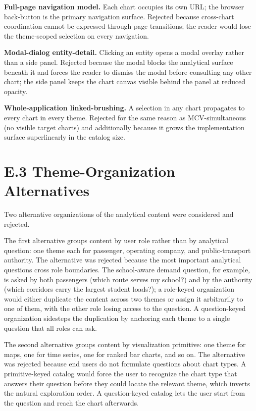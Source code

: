 \noindent\textbf{Full-page navigation model.}
Each chart occupies its own URL; the browser back-button is the
primary navigation surface. Rejected because cross-chart coordination
cannot be expressed through page transitions; the reader would lose
the theme-scoped selection on every navigation.

\noindent\textbf{Modal-dialog entity-detail.}
Clicking an entity opens a modal overlay rather than a side panel.
Rejected because the modal blocks the analytical surface beneath it
and forces the reader to dismiss the modal before consulting any other
chart; the side panel keeps the chart canvas visible behind the panel
at reduced opacity.

\noindent\textbf{Whole-application linked-brushing.}
A selection in any chart propagates to every chart in every theme.
Rejected for the same reason as MCV-simultaneous (no visible target
charts) and additionally because it grows the implementation surface
superlinearly in the catalog size.

\section*{E.3 Theme-Organization Alternatives}
\label{sec:solution:themes:alt}

Two alternative organizations of the analytical content were considered and
rejected.

The first alternative groups content by user role rather than by analytical
question: one theme each for passenger, operating company, and public-transport
authority. The alternative was rejected because the most
important analytical questions cross role boundaries. The school-aware
demand question, for example, is asked by both passengers (which route
serves my school?) and by the authority (which corridors carry the largest
student loads?); a role-keyed organization would either duplicate the
content across two themes or assign it arbitrarily to one of them, with the
other role losing access to the question. A question-keyed organization
sidesteps the duplication by anchoring each theme to a single question that
all roles can ask.

The second alternative groups content by visualization primitive: one
theme for maps, one for time series, one for ranked bar charts, and so on.
The alternative was rejected because end users do not formulate questions
about chart types. A primitive-keyed catalog would force the user to
recognize the chart type that answers their question before they could
locate the relevant theme, which inverts the natural exploration order. A
question-keyed catalog lets the user start from the question and reach
the chart afterwards.

